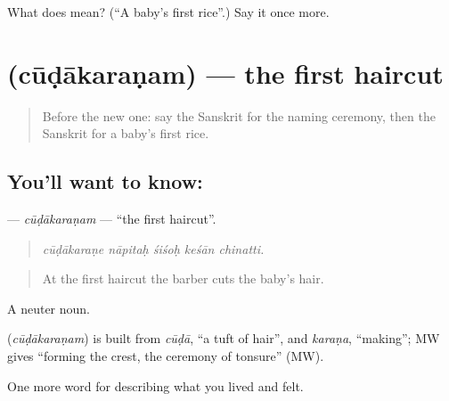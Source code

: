 \begin{tcolorbox}[breakable,colback=teal!4,colframe=teal!35!black,title={Before you move on}]
What does  mean? (\textquotedblleft{}A baby's first rice\textquotedblright{}.) Say it once more.
\end{tcolorbox}
\section[\texorpdfstring{\sk{चूडाकरणम्} (cūḍākaraṇam)}{चूडाकरणम् (cūḍākaraṇam)}]{ (cūḍākaraṇam) — the first haircut}

\label{lesson:SA-C493-cudakaranam}



\begin{quote}
Before the new one: say the Sanskrit for the naming ceremony, then the Sanskrit for a baby's first rice.
\end{quote}

\subsection*{You'll want to know: }
\textbf{} — \emph{cūḍākaraṇam} — \textquotedblleft{}the first haircut\textquotedblright{}.

\begin{quote}
    
\end{quote}

\begin{quote}
\emph{cūḍākaraṇe nāpitaḥ śiśoḥ keśān chinatti.}
\end{quote}

\begin{quote}
At the first haircut the barber cuts the baby's hair.
\end{quote}

A neuter noun.

\begin{cousinweb}
\textbf{} (\emph{cūḍākaraṇam}) is built from \emph{cūḍā}, \textquotedblleft{}a tuft of hair\textquotedblright{}, and \emph{karaṇa}, \textquotedblleft{}making\textquotedblright{}; MW gives \textquotedblleft{}forming the crest, the ceremony of tonsure\textquotedblright{} (MW).
\end{cousinweb}

\begin{grammarlens}[title={What you've built}]
One more word for describing what you lived and felt.
\end{grammarlens}

